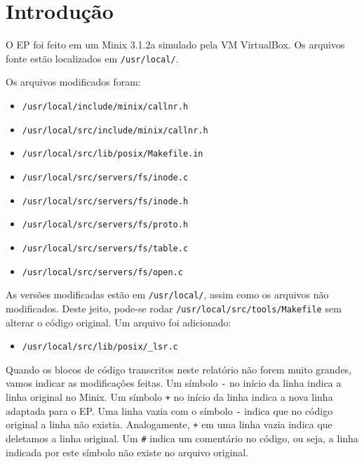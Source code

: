 \documentclass{amsart}
\title[]{\rule{10.5cm}{0.8pt}\\Exercício-Programa 4
\\\vspace{2mm}\footnotesize
  Sistemas Operacionais --- MAC0422\\\rule{10cm}{0.8pt}}
\author[]{Renato Lui Geh\\NUSP\@: 8536030\\
          Guilherme Freire\\NUSP\@: 7557373}
\theoremstyle{plain}
\newcommand{\code}[1]{\lstinline[mathescape=true]{#1}}
\begin{document}
\date{\today}
\maketitle

\section{Introdução}

O EP foi feito em um Minix 3.1.2a simulado pela VM VirtualBox. Os arquivos fonte estão localizados
em \code{/usr/local/}.

Os arquivos modificados foram:

\begin{itemize}
  \item \code{/usr/local/include/minix/callnr.h}
  \item \code{/usr/local/src/include/minix/callnr.h}
  \item \code{/usr/local/src/lib/posix/Makefile.in}
  \item \code{/usr/local/src/servers/fs/inode.c}
  \item \code{/usr/local/src/servers/fs/inode.h}
  \item \code{/usr/local/src/servers/fs/proto.h}
  \item \code{/usr/local/src/servers/fs/table.c}
  \item \code{/usr/local/src/servers/fs/open.c}
\end{itemize}

As versões modificadas estão em \code{/usr/local/}, assim como os arquivos não modificados. Deste
jeito, pode-se rodar \code{/usr/local/src/tools/Makefile} sem alterar o código original. Um arquivo foi adicionado:

\begin{itemize}
  \item \code{/usr/local/src/lib/posix/_lsr.c}
\end{itemize}

Quando os blocos de código transcritos neste relatório não forem muito grandes, vamos indicar as
modificações feitas. Um símbolo \code{-} no início da linha indica a linha original no Minix. Um
símbolo \code{+} no início da linha indica a nova linha adaptada para o EP\@. Uma linha vazia com o
símbolo \code{-} indica que no código original a linha não existia. Analogamente, \code{+} em uma
linha vazia indica que deletamos a linha original. Um \code{#} indica um comentário no código, ou
seja, a linha indicada por este símbolo não existe no arquivo original.
\end{document}
